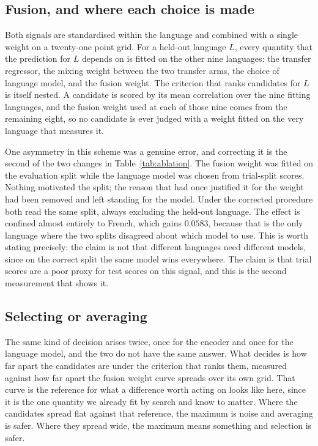 \subsection{Fusion, and where each choice is made}
\label{sec:lolo}

Both signals are standardised within the language and combined with a
single weight on a twenty-one point grid. For a held-out language $L$,
every quantity that the prediction for $L$ depends on is fitted on the
other nine languages: the transfer regressor, the mixing weight between
the two transfer arms, the choice of language model, and the fusion
weight. The criterion that ranks candidates for $L$ is itself nested. A
candidate is scored by its mean correlation over the nine fitting
languages, and the fusion weight used at each of those nine comes from
the remaining eight, so no candidate is ever judged with a weight fitted
on the very language that measures it.

One asymmetry in this scheme was a genuine error, and correcting it is
the second of the two changes in Table~\ref{tab:ablation}. The fusion
weight was fitted on the evaluation split while the language model was
chosen from trial-split scores. Nothing motivated the split; the reason
that had once justified it for the weight had been removed and left
standing for the model. Under the corrected procedure both read the same
split, always excluding the held-out language. The effect is confined
almost entirely to French, which gains $0.0583$, because that is the
only language where the two splits disagreed about which model to use.
This is worth stating precisely: the claim is not that different
languages need different models, since on the correct split the same
model wins everywhere. The claim is that trial scores are a poor proxy
for test scores on this signal, and this is the second measurement that
shows it.

\subsection{Selecting or averaging}
\label{sec:selectavg}

The same kind of decision arises twice, once for the encoder and once
for the language model, and the two do not have the same answer. What
decides is how far apart the candidates are under the criterion that
ranks them, measured against how far apart the fusion weight curve
spreads over its own grid. That curve is the reference for what a
difference worth acting on looks like here, since it is the one
quantity we already fit by search and know to matter. Where the
candidates spread flat against that reference, the maximum is noise and
averaging is safer. Where they spread wide, the maximum means something
and selection is safer.

